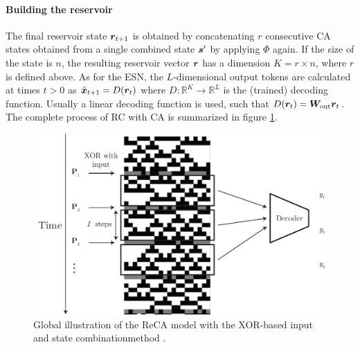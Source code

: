 \paragraph{Building the reservoir}
The final reservoir state ${\bm{r}}_{t + 1}$ is obtained by concatenating $r$
consecutive CA states obtained from a single combined state ${\bm{s}}'$ by applying
$\Phi$ again. If the size of the state is $n$, the resulting reservoir vector
${\bm{r}}$ has a dimension $K = r \times n$, where $r$ is defined above. As for the
\ac{ESN}, the $L$-dimensional output tokens are calculated at times $t > 0$ as
$\tilde{{\bm{x}}}_{t+ 1} = D({\bm{r}}_{t})$ where
$D: \mathbb{R}^{K} \rightarrow \mathbb{R}^{L}$ is the (trained) decoding
function. Usually a linear decoding function is used, such that
$D({\bm{r}}_{t}) = {\bm{W}}_{\text{out}}{\bm{r}}_{t}$. The complete process of \ac{RC} with
\ac{CA} is summarized in figure \ref{fig:reca-schema}.

\begin{figure}[htbp]
  \centering
  \includegraphics[width=.6\linewidth]{figures/reca_schema.pdf}
  \caption{Global illustration of the ReCA model with the XOR-based input and
    state combinationmethod .}\label{fig:reca-schema}
\end{figure}
